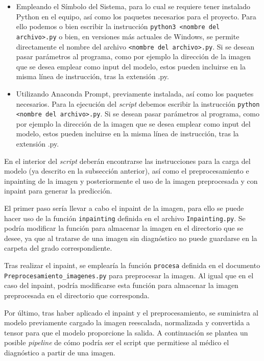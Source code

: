\begin{itemize}
\begin{itemize}
    \item Empleando el Símbolo del Sistema, para lo cual se requiere tener instalado Python en el equipo, así como los paquetes necesarios para el proyecto. Para ello podemos o bien escribir la instrucción \texttt{python3 <nombre del archivo>.py} o bien, en versiones más actuales de Windows, se permite directamente el nombre del archivo \texttt{<nombre del archivo>.py}. Si se desean pasar parámetros al programa, como por ejemplo la dirección de la imagen que se desea emplear como input del modelo, estos pueden incluirse en la misma línea de instrucción, tras la extensión .py.
    \item Utilizando Anaconda Prompt, previamente instalada, así como los paquetes necesarios. Para la ejecución del \textit{script} debemos escribir la instrucción \texttt{python <nombre del archivo>.py}. Si se desean pasar parámetros al programa, como por ejemplo la dirección de la imagen que se desea emplear como input del modelo, estos pueden incluirse en la misma línea de instrucción, tras la extensión .py.
\end{itemize}

En el interior del \textit{script} deberán encontrarse las instrucciones para la carga del modelo (ya descrito en la subsección anterior), así como el preprocesamiento e inpainting de la imagen y posteriormente el uso de la imagen preprocesada y con inpaint para generar la predicción.

El primer paso sería llevar a cabo el inpaint de la imagen, para ello se puede hacer uso de la función \texttt{inpainting} definida en el archivo \texttt{Inpainting.py}. Se podría modificar la función para almacenar la imagen en el directorio que se desee, ya que al tratarse de una imagen sin diagnóstico no puede guardarse en la carpeta del grado correspondiente.

Tras realizar el inpaint, se emplearía la función \texttt{procesa} definida en el documento \texttt{Preprocesamiento\_imagenes.py} para preprocesar la imagen. Al igual que en el caso del inpaint, podría modificarse esta función para almacenar la imagen preprocesada en el directorio que corresponda. 

Por último, tras haber aplicado el inpaint y el preprocesamiento, se suministra al modelo previamente cargado la imagen reescalada, normalizada y convertida a tensor para que el modelo proporcione la salida. A continuación se plantea un posible \textit{pipeline} de cómo podría ser el script que permitiese al médico el diagnóstico a partir de una imagen.


\end{itemize}
